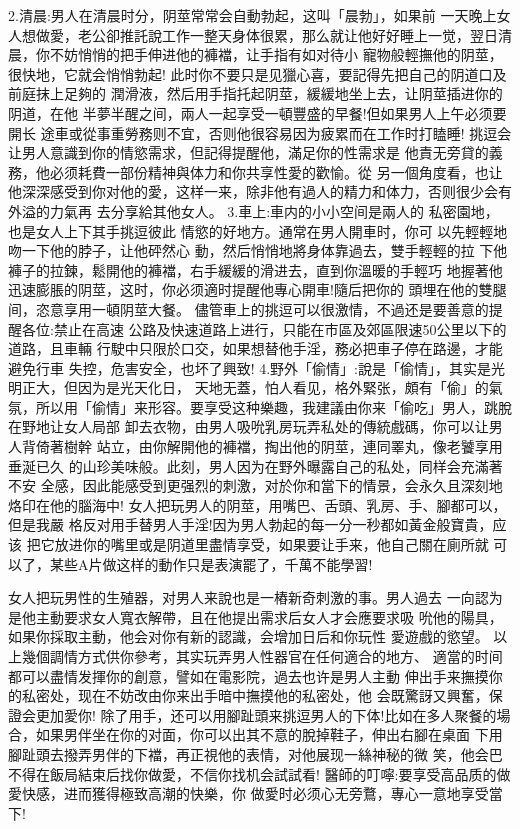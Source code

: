 \documentclass[12pt,UTF8]{ctexbook}
\begin{document}
2.清晨:男人在清晨时分，阴莖常常会自動勃起，这叫「晨勃」，如果前
一天晚上女人想做愛，老公卻推託說工作一整天身体很累，那么就让他好好睡上一觉，翌日清晨，你不妨悄悄的把手伸进他的褲襠，让手指有如对待小
寵物般輕撫他的阴莖，很快地，它就会悄悄勃起!
此时你不要只是见獵心喜，要記得先把自己的阴道口及前庭抹上足夠的
潤滑液，然后用手指托起阴莖，緩緩地坐上去，让阴莖插进你的阴道，在他
半夢半醒之间，兩人一起享受一頓豐盛的早餐!但如果男人上午必须要開长
途車或從事重勞務则不宜，否则他很容易因为疲累而在工作时打瞌睡!
挑逗会让男人意識到你的情慾需求，但記得提醒他，滿足你的性需求是
他責无旁貸的義務，他必须耗費一部份精神與体力和你共享性愛的歡愉。從
另一個角度看，也让他深深感受到你对他的愛，这样一来，除非他有過人的精力和体力，否则很少会有外溢的力氣再
去分享給其他女人。
3.車上:車内的小小空间是兩人的
私密園地，也是女人上下其手挑逗彼此
情慾的好地方。通常在男人開車时，你可
以先輕輕地吻一下他的脖子，让他砰然心
動，然后悄悄地將身体靠過去，雙手輕輕的拉
下他褲子的拉鍊，鬆開他的褲襠，右手緩緩的滑进去，直到你溫暖的手輕巧
地握著他迅速膨脹的阴莖，这时，你必须適时提醒他專心開車!隨后把你的
頭埋在他的雙腿间，恣意享用一頓阴莖大餐。
儘管車上的挑逗可以很激情，不過还是要善意的提醒各位:禁止在高速
公路及快速道路上进行，只能在市區及郊區限速50公里以下的道路，且車輛
行駛中只限於口交，如果想替他手淫，務必把車子停在路邊，才能避免行車
失控，危害安全，也坏了興致!
4.野外「偷情」:說是「偷情」，其实是光明正大，但因为是光天化日，
天地无蓋，怕人看见，格外緊张，頗有「偷」的氣氛，所以用「偷情」来形容。要享受这种樂趣，我建議由你来「偷吃」男人，跳脫在野地让女人局部
卸去衣物，由男人吸吮乳房玩弄私处的傳統戲碼，你可以让男人背倚著樹幹
站立，由你解開他的褲襠，掏出他的阴莖，連同睪丸，像老饕享用垂涎已久
的山珍美味般。此刻，男人因为在野外曝露自己的私处，同样会充滿著不安
全感，因此能感受到更强烈的刺激，对於你和當下的情景，会永久且深刻地
烙印在他的腦海中!
女人把玩男人的阴莖，用嘴巴、舌頭、乳房、手、腳都可以，但是我嚴
格反对用手替男人手淫!因为男人勃起的每一分一秒都如黃金般寶貴，应该
把它放进你的嘴里或是阴道里盡情享受，如果要让手来，他自己關在廁所就
可以了，某些A片做这样的動作只是表演罷了，千萬不能學習!

女人把玩男性的生殖器，对男人来說也是一樁新奇刺激的事。男人過去
一向認为是他主動要求女人寬衣解帶，且在他提出需求后女人才会應要求吸
吮他的陽具，如果你採取主動，他会对你有新的認識，会增加日后和你玩性
愛遊戲的慾望。
以上幾個調情方式供你參考，其实玩弄男人性器官在任何適合的地方、
適當的时间都可以盡情发揮你的創意，譬如在電影院，過去也许是男人主動
伸出手来撫摸你的私密处，现在不妨改由你来出手暗中撫摸他的私密处，他
会既驚訝又興奮，保證会更加愛你!
除了用手，还可以用腳趾頭来挑逗男人的下体!比如在多人聚餐的場
合，如果男伴坐在你的对面，你可以出其不意的脫掉鞋子，伸出右腳在桌面
下用腳趾頭去撥弄男伴的下襠，再正視他的表情，对他展现一絲神秘的微
笑，他会巴不得在飯局結束后找你做愛，不信你找机会試試看!
醫師的叮嚀:要享受高品质的做愛快感，进而獲得極致高潮的快樂，你
做愛时必须心无旁鶩，專心一意地享受當下!
\end{document}
